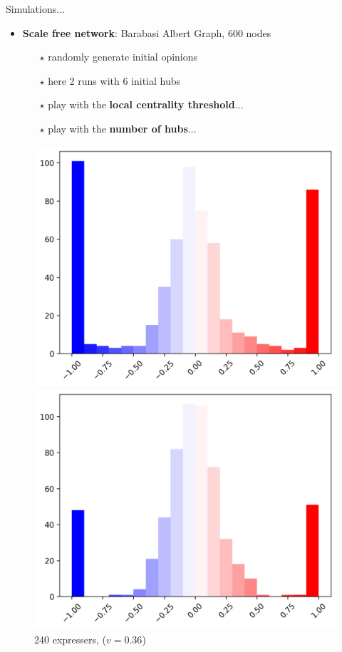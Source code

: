 \documentclass[xcolor=table,handout]{beamer}
\begin{document}
\begin{frame}{Simulations...}
\begin{itemize}
	\item {\bf\color{purple}Scale free network}: Barabasi Albert Graph, $600$ nodes
		\begin{itemize}  
			\item[$\star$] randomly generate initial opinions
			\item[$\star$] here 2 runs with 6 initial hubs 
			\item[$\star$] play with the {\bf\color{purple}local centrality threshold}... 
			\item[$\star$] play with the {\bf\color{purple}number of hubs}... 
		\end{itemize}
\end{itemize}
\begin{figure}
\hspace{0.2cm}
\begin{minipage}{.5\textwidth}
  \includegraphics[scale = 0.34]{./img/hist_opinions.png}
  \caption{240 expressers, ($v=0.36$)}
\end{minipage}%
\begin{minipage}{.5\textwidth}
  \includegraphics[scale = 0.34]{./img/hist_opinions_run_8_nodes_08_quantile_600.png}

\end{minipage}
\end{figure}
\end{frame}
\end{document}
